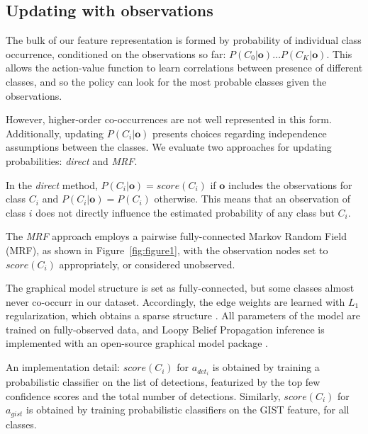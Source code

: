 \subsection{Updating with observations} \label{sec:updating}

The bulk of our feature representation is formed by probability of individual class occurrence, conditioned on the observations so far: $P(C_0|\mathbf{o}) \ldots P(C_K|\mathbf{o})$.
This allows the action-value function to learn correlations between presence of different classes, and so the policy can look for the most probable classes given the observations.

However, higher-order co-occurrences are not well represented in this form.
Additionally, updating $P(C_i|\mathbf{o})$ presents choices regarding independence assumptions between the classes.
We evaluate two approaches for updating probabilities: \emph{direct} and \emph{MRF}.

In the \emph{direct} method, $P(C_i|\mathbf{o}) = score(C_i)$ if $\mathbf{o}$ includes the observations for class $C_i$ and $P(C_i|\mathbf{o}) = P(C_i)$ otherwise.
This means that an observation of class $i$ does not directly influence the estimated probability of any class but $C_i$.

The \emph{MRF} approach employs a pairwise fully-connected Markov Random Field (MRF), as shown in Figure~\ref{fig:figure1}, with the observation nodes set to $score(C_i)$ appropriately, or considered unobserved.

The graphical model structure is set as fully-connected, but some classes almost never co-occurr in our dataset.
Accordingly, the edge weights are learned with $L_1$ regularization, which obtains a sparse structure \cite{Lee2006}.
All parameters of the model are trained on fully-observed data, and Loopy Belief Propagation inference is implemented with an open-source graphical model package \cite{Jaimovich2010}.

An implementation detail: $score(C_i)$ for $a_{{det}_i}$ is obtained by training a probabilistic classifier on the list of detections, featurized by the top few confidence scores and the total number of detections.
Similarly, $score(C_i)$ for $a_{gist}$ is obtained by training probabilistic classifiers on the GIST feature, for all classes.
